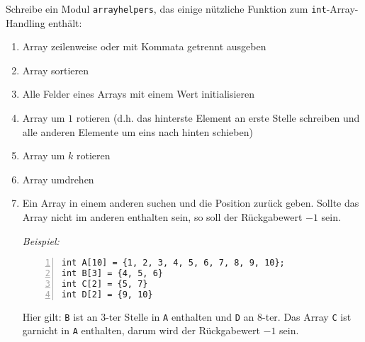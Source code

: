 \begin{aufg}
Schreibe ein Modul \verb|arrayhelpers|, das einige nützliche Funktion zum \verb|int|-Array-Handling enthält:
\begin{enumerate}
\item Array zeilenweise oder mit Kommata getrennt ausgeben
\item Array sortieren
\item Alle Felder eines Arrays mit einem Wert initialisieren
\item Array um $1$ rotieren (d.h. das hinterste Element an erste Stelle schreiben und alle anderen Elemente um eins nach hinten schieben)
\item Array um $k$ rotieren
\item Array umdrehen
\item Ein Array in einem anderen suchen und die Position zurück geben. Sollte das Array nicht im anderen enthalten sein, so soll der Rückgabewert $-1$ sein.

\emph{Beispiel:} 
\begin{codelisting}
\begin{lstlisting}[numbers=left,numberstyle=\tiny,frame=tlrb]
int A[10] = {1, 2, 3, 4, 5, 6, 7, 8, 9, 10};
int B[3] = {4, 5, 6}
int C[2] = {5, 7}
int D[2] = {9, 10}
\end{lstlisting}
\end{codelisting}
Hier gilt: \verb|B| ist an $3$-ter Stelle in \verb|A| enthalten und \verb|D| an $8$-ter. Das Array \verb|C| ist garnicht in \verb|A| enthalten, darum wird der Rückgabewert $-1$ sein.

\end{enumerate}
\end{aufg}